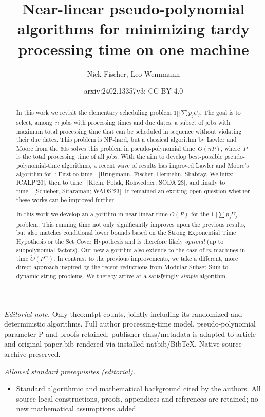 \documentclass[10pt,a4paper]{article}
\title{Near-linear pseudo-polynomial algorithms for minimizing tardy processing time on one machine}
\author{Nick Fischer, Leo Wennmann}
\date{arxiv:2402.13357v3; CC BY 4.0}
\newcommand\Order{O}
\begin{document}
\maketitle
\noindent\textit{Editorial note.} Only theo:mtpt counts, jointly including its randomized and deterministic algorithms. Full author processing-time model, pseudo-polynomial parameter P and proofs retained; publisher class/metadata is adapted to article and original paper.bib rendered via installed natbib/BibTeX. Native source archive preserved.\par\medskip
\noindent\textit{Allowed standard prerequisites (editorial).}\begin{itemize}
\item Standard algorithmic and mathematical background cited by the authors. All source-local constructions, proofs, appendices and references are retained; no new mathematical assumptions added.
\end{itemize}\medskip




\begin{abstract}
    In this work we revisit the elementary scheduling problem $1||\sum p_j U_j$. The goal is to select, among~$n$ jobs with processing times and due dates, a subset of jobs with maximum total processing time that can be scheduled in sequence without violating their due dates. This problem is NP-hard, but a classical algorithm by Lawler and Moore from the 60s solves this problem in pseudo-polynomial time~$\Order(nP)$, where~$P$ is the total processing time of all jobs. With the aim to develop best-possible pseudo-polynomial-time algorithms, a recent wave of results has improved Lawler and Moore's algorithm for~: First to time~\smash{$\widetilde\Order(P^{7/4})$}~[Bringmann, Fischer, Hermelin, Shabtay, Wellnitz; ICALP'20], then to time \smash{$\widetilde\Order(P^{5/3})$}~[Klein, Polak, Rohwedder; SODA'23], and finally to time~\smash{$\widetilde\Order(P^{7/5})$}~[Schieber, Sitaraman; WADS'23]. It remained an exciting open question whether these works can be improved further.
    
    In this work we develop an algorithm in near-linear time $\widetilde\Order(P)$ for the $1||\sum p_j U_j$ problem. This running time not only significantly improves upon the previous results, but also matches conditional lower bounds based on the Strong Exponential Time Hypothesis or the Set Cover Hypothesis and is therefore likely \emph{optimal} (up to subpolynomial factors). Our new algorithm also extends to the case of $m$ machines in time $\widetilde\Order(P^m)$. In contrast to the previous improvements, we take a different, more direct approach inspired by the recent reductions from Modular Subset Sum to dynamic string problems. We thereby arrive at a satisfyingly \emph{simple} algorithm.
\end{abstract}
\end{document}
